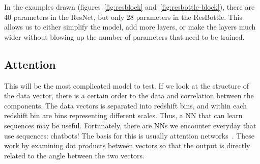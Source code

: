 In the examples drawn (figures~\ref{fig:resblock} and~\ref{fig:resbottle-block}), there are 40 parameters in the ResNet, but only 28 parameters in the ResBottle. This allows us to either simplify the model, add more layers, or make the layers much wider without blowing up the number of parameters that need to be trained.
\subsection{Attention}
This will be the most complicated model to test. If we look at the structure of the data vector, there is a certain order to the data and correlation between the components. The data vectors is separated into redshift bins, and within each redshift bin are bins representing different scales. Thus, a NN that can learn sequences may be useful. Fortunately, there are NNs we encounter everyday that use sequences: chatbots! The basis for this is usually attention networks~\cite{vaswani_attention_2017}. These work by examining dot products between vectors so that the output is directly related to the angle between the two vectors.

